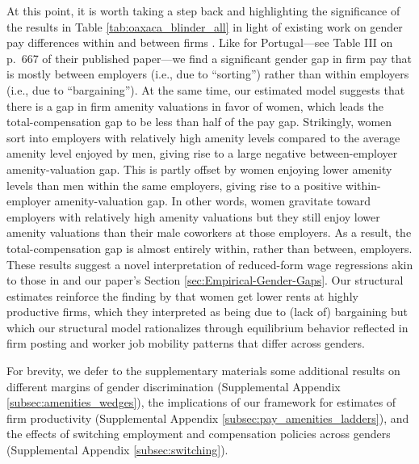 At this point, it is worth taking a step back and highlighting the significance of the results in Table \ref{tab:oaxaca_blinder_all} in light of existing work on gender pay differences within and between firms \citep[e.g.,][]{CardCardosoKline2016}. Like \citet{CardCardosoKline2016} for Portugal---see Table III on p.\ 667 of their published paper---we find a significant gender gap in firm pay that is mostly between employers (i.e., due to ``sorting'') rather than within employers (i.e., due to ``bargaining''). At the same time, our estimated model suggests that there is a gap in firm amenity valuations in favor of women, which leads the total-compensation gap to be less than half of the pay gap. Strikingly, women sort into employers with relatively high amenity levels compared to the average amenity level enjoyed by men, giving rise to a large negative between-employer amenity-valuation gap. This is partly offset by women enjoying lower amenity levels than men within the same employers, giving rise to a positive within-employer amenity-valuation gap. In other words, women gravitate toward employers with relatively high amenity valuations but they still enjoy lower amenity valuations than their male coworkers at those employers. As a result, the total-compensation gap is almost entirely within, rather than between, employers. These results suggest a novel interpretation of reduced-form wage regressions akin to those in \citet{CardCardosoKline2016} and our paper's Section \ref{sec:Empirical-Gender-Gaps}. Our structural estimates reinforce the finding by \citet{CardCardosoKline2016} that women get lower rents at highly productive firms, which they interpreted as being due to (lack of) bargaining but which our structural model rationalizes through equilibrium behavior reflected in firm posting and worker job mobility patterns that differ across genders.

For brevity, we defer to the supplementary materials some additional results on different margins of gender discrimination (Supplemental Appendix \ref{subsec:amenities_wedges}), the implications of our framework for estimates of firm productivity (Supplemental Appendix \ref{subsec:pay_amenities_ladders}), and the effects of switching employment and compensation policies across genders (Supplemental Appendix \ref{subsec:switching}).